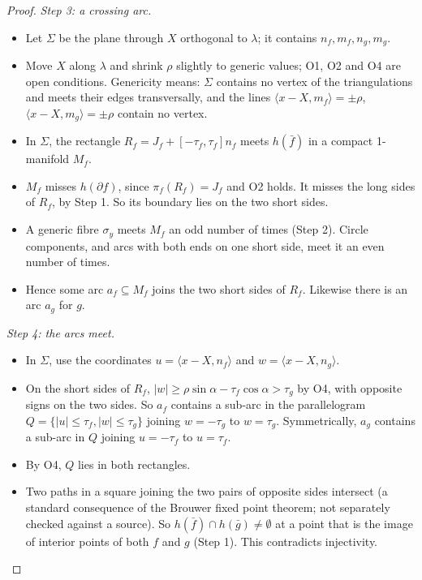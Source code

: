 \begin{proof}
\emph{Step 3: a crossing arc.}
\begin{itemize}
\item Let $\Sigma$ be the plane through $X$ orthogonal to $\lambda$; it contains $n_f,m_f,n_g,m_g$.
\item Move $X$ along $\lambda$ and shrink $\rho$ slightly to generic values; O1, O2 and O4 are open conditions.
Genericity means: $\Sigma$ contains no vertex of the triangulations and meets their edges transversally, and the
lines $\langle x-X,m_f\rangle=\pm\rho$, $\langle x-X,m_g\rangle=\pm\rho$ contain no vertex.
\item In $\Sigma$, the rectangle $R_f=J_f+[-\tau_f,\tau_f]n_f$ meets $h(\bar f)$ in a compact 1-manifold $M_f$.
\item $M_f$ misses $h(\partial f)$, since $\pi_f(R_f)=J_f$ and O2 holds. It misses the long sides of $R_f$, by
Step 1. So its boundary lies on the two short sides.
\item A generic fibre $\sigma_y$ meets $M_f$ an odd number of times (Step 2). Circle components, and arcs with both
ends on one short side, meet it an even number of times.
\item Hence some arc $a_f\subseteq M_f$ joins the two short sides of $R_f$. Likewise there is an arc $a_g$ for $g$.
\end{itemize}

\emph{Step 4: the arcs meet.}
\begin{itemize}
\item In $\Sigma$, use the coordinates $u=\langle x-X,n_f\rangle$ and $w=\langle x-X,n_g\rangle$.
\item On the short sides of $R_f$, $|w|\ge\rho\sin\alpha-\tau_f\cos\alpha>\tau_g$ by O4, with opposite signs on
the two sides. So $a_f$ contains a sub-arc in the parallelogram $Q=\{|u|\le\tau_f,|w|\le\tau_g\}$ joining
$w=-\tau_g$ to $w=\tau_g$. Symmetrically, $a_g$ contains a sub-arc in $Q$ joining $u=-\tau_f$ to $u=\tau_f$.
\item By O4, $Q$ lies in both rectangles.
\item Two paths in a square joining the two pairs of opposite sides intersect (a standard consequence of the Brouwer
fixed point theorem; not separately checked against a source). So $h(\bar f)\cap h(\bar g)\ne\emptyset$ at a point that is
the image of interior points of both $f$ and $g$ (Step 1). This contradicts injectivity.
\end{itemize}
\end{proof}

